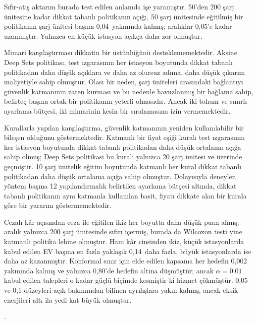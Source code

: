 Sıfır-atış aktarım burada test edilen anlamda işe yaramıştır.
50'den 200 şarj ünitesine kadar dikkat tabanlı politikanın açığı, 50 şarj ünitesinde eğitilmiş bir politikanın şarj ünitesi başına 0,04\,\texteuro{} yakınında kalmış; aralıklar 0,05'e kadar uzanmıştır.
Yalnızca en küçük istasyon açıkça daha zor olmuştur.

Mimari karşılaştırması dikkatin bir üstünlüğünü desteklememektedir.
Aksine Deep Sets politikası, test ızgarasının her istasyon boyutunda dikkat tabanlı politikadan daha düşük açıklara ve daha az olursuz adıma, daha düşük çıkarım maliyetiyle sahip olmuştur.
Olası bir neden, şarj üniteleri arasındaki bağlantıyı güvenlik katmanının zaten kurması ve bu nedenle havuzlanmış bir bağlama sahip, belirteç başına ortak bir politikanın yeterli olmasıdır.
Ancak iki tohum ve sınırlı ayarlama bütçesi, iki mimarinin kesin bir sıralamasına izin vermemektedir.

Kurallarla yapılan karşılaştırma, güvenlik katmanının yeniden kullanılabilir bir bileşen olduğunu göstermektedir.
Katmanlı bir fiyat eşiği kuralı test ızgarasının her istasyon boyutunda dikkat tabanlı politikadan daha düşük ortalama açığa sahip olmuş; Deep Sets politikası bu kuralı yalnızca 20 şarj ünitesi ve üzerinde geçmiştir.
10 şarj ünitelik eğitim boyutunda katmanlı her kural dikkat tabanlı politikadan daha düşük ortalama açığa sahip olmuştur.
Dolayısıyla deneyler, yöntem başına 12 yapılandırmalık belirtilen ayarlama bütçesi altında, dikkat tabanlı politikanın aynı katmanla kullanılan basit, fiyatı dikkate alan bir kurala göre bir yararını göstermemektedir.

Cezalı kâr açısından ceza ile eğitilen ikiz her boyutta daha düşük puan almış; aralık yalnızca 200 şarj ünitesinde sıfırı içermiş, burada da Wilcoxon testi yine katmanlı politika lehine olmuştur.
Ham kâr cinsinden ikiz, küçük istasyonlarda kabul edilen EV başına en fazla yaklaşık 0,14\,\texteuro{} daha fazla, büyük istasyonlarda ise daha az kazanmıştır.
Konformal sınır için elde edilen kapsama her hedefin 0,002 yakınında kalmış ve yalnızca 0,80'de hedefin altına düşmüştür; ancak $\alpha=0.01$ kabul edilen talepleri o kadar güçlü biçimde kesmiştir ki hizmet çökmüştür.
0,05 ve 0,1 düzeyleri açık bakımından bilinen ayrılışlara yakın kalmış, ancak eksik enerjileri altı ila yedi kat büyük olmuştur.

.

